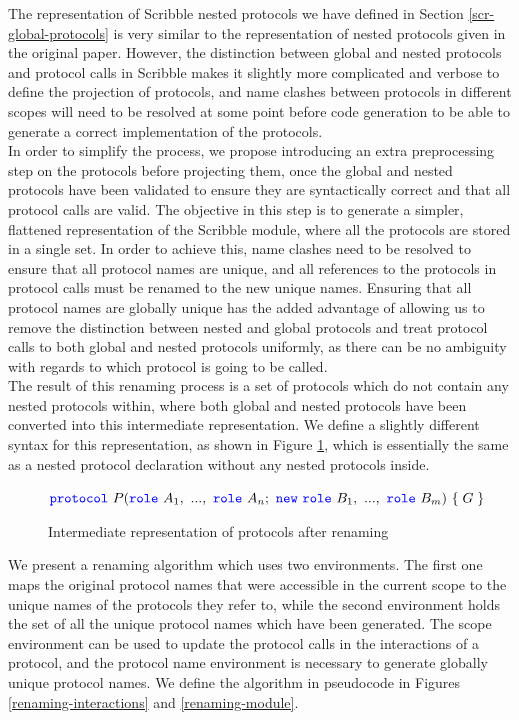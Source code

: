 \documentclass[12pt,twoside]{report}
\begin{document}
The representation of Scribble nested protocols we have defined in Section \ref{scr-global-protocols} is very similar to the representation of nested protocols given in the original paper\cite{nestedprotocols}. However, the distinction between global and nested protocols and protocol calls in Scribble makes it slightly more complicated and verbose to define the projection of protocols, and name clashes between protocols in different scopes will need to be resolved at some point before code generation to be able to generate a correct implementation of the protocols.\\

In order to simplify the process, we propose introducing an extra preprocessing step on the protocols before projecting them, once the global and nested protocols have been validated to ensure they are syntactically correct and that all protocol calls are valid. The objective in this step is to generate a simpler, flattened representation of the Scribble module, where all the protocols are stored in a single set. In order to achieve this, name clashes need to be resolved to ensure that all protocol names are unique, and all references to the protocols in protocol calls must be renamed to the new unique names. Ensuring that all protocol names are globally unique has the added advantage of allowing us to remove the distinction between nested and global protocols and treat protocol calls to both global and nested protocols uniformly, as there can be no ambiguity with regards to which protocol is going to be called.\\

The result of this renaming process is a set of protocols which do not contain any nested protocols within, where both global and nested protocols have been converted into this intermediate representation. We define a slightly different syntax for this representation, as shown in Figure \ref{protocols-after-renaming}, which is essentially the same as a nested protocol declaration without any nested protocols inside.\\

\begin{figure}[h!]
    \centering
    $\protocol\ P(\role\ A_1,\ ...,\ \role\ A_n;\ \scrnew\ \role\ B_1,\ ...,\ \role\ B_m)\ \{\;G\;\}$\\
    \caption{Intermediate representation of protocols after renaming}
    \label{protocols-after-renaming}
\end{figure}

We present a renaming algorithm which uses two environments. The first one maps the original protocol names that were accessible in the current scope to the unique names of the protocols they refer to, while the second environment holds the set of all the unique protocol names which have been generated. The scope environment can be used to update the protocol calls in the interactions of a protocol, and the protocol name environment is necessary to generate globally unique protocol names. We define the algorithm in pseudocode in Figures \ref{renaming-interactions} and \ref{renaming-module}.\\
\end{document}
